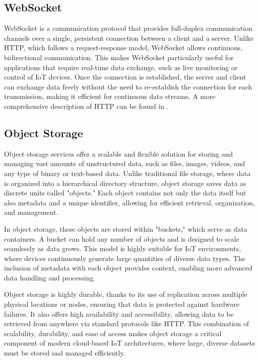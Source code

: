 \subsection*{WebSocket}
\label{sec:websocket}
WebSocket is a communication protocol that provides full-duplex communication channels over a single, persistent connection between a client and a server. Unlike HTTP, which follows a request-response model, WebSocket allows continuous, bidirectional communication. This makes WebSocket particularly useful for applications that require real-time data exchange, such as live monitoring or control of IoT devices. Once the connection is established, the server and client can exchange data freely without the need to re-establish the connection for each transmission, making it efficient for continuous data streams. A more comprehensive description of HTTP can be found in \cite{site:websocket}.

\subsection*{Object Storage}
\label{sec:object-storage}
Object storage services offer a scalable and flexible solution for storing and managing vast amounts of unstructured data, such as files, images, videos, and any type of binary or text-based data. Unlike traditional file storage, where data is organized into a hierarchical directory structure, object storage saves data as discrete units called "objects." Each object contains not only the data itself but also metadata and a unique identifier, allowing for efficient retrieval, organization, and management.

In object storage, these objects are stored within "buckets," which serve as data containers. A bucket can hold any number of objects and is designed to scale seamlessly as data grows. This model is highly suitable for IoT environments, where devices continuously generate large quantities of diverse data types. The inclusion of metadata with each object provides context, enabling more advanced data handling and processing.

Object storage is highly durable, thanks to its use of replication across multiple physical locations or nodes, ensuring that data is protected against hardware failures. It also offers high availability and accessibility, allowing data to be retrieved from anywhere via standard protocols like HTTP. This combination of scalability, durability, and ease of access makes object storage a critical component of modern cloud-based IoT architectures, where large, diverse datasets must be stored and managed efficiently.


